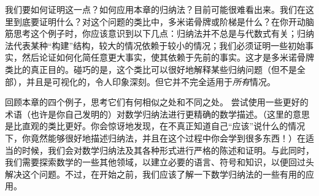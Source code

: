 我们要如何证明这一点？如何应用本章的归纳法？目前可能很难看出来。我们在这里到底要证明什么？对这个问题的类比中，多米诺骨牌或阶梯是什么？在你开动脑筋思考这个例子时，你应该意识到以下几点：归纳法并不总是与代数式有关；归纳法代表某种``构建''结构，较大的情况依赖于较小的情况；我们必须证明一些初始事实，然后论证如何化简任意更大事实，使其依赖于先前的事实。这才是多米诺骨牌类比的真正目的。碰巧的是，这个类比可以很好地解释某些归纳问题（但不是全部），并且是可视化的，令人印象深刻。但它并不完全适用于\emph{所有}情况。

回顾本章的四个例子，思考它们有何相似之处和不同之处。 尝试使用一些更好的术语（也许是你自己发明的）对数学归纳法进行更精确的数学描述。（这里的意思是比直观的类比更好。你会惊讶地发现，在不真正知道自己``应该''说什么的情况下，你竟然能够很好地描述归纳法，并且在这个过程中你会学到很多东西！）在适当的时候，我们会对数学归纳法及其各种形式进行严格的陈述和证明。与此同时，我们需要探索数学的一些其他领域，以建立必要的语言、符号和知识，以便回过头解决这个问题。不过，在开始之前，我们应该了解一下数学归纳法的一些有用的应用。
